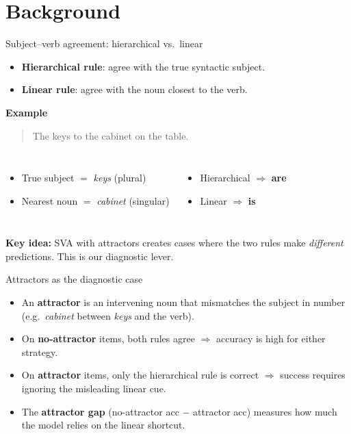 \section{Background}

\begin{frame}{Subject--verb agreement: hierarchical vs.\ linear}
  \begin{itemize}
    \item \textbf{Hierarchical rule}: agree with the true syntactic subject.
    \item \textbf{Linear rule}: agree with the noun closest to the verb.
  \end{itemize}

  \vspace{0.3cm}
  \textbf{Example}
  \begin{quote}
    The keys to the cabinet \underline{\hspace{1cm}} on the table.
  \end{quote}

  \begin{columns}[T]
    \begin{itemize}
      \item True subject $=$ \textit{keys} (plural)
      \item Nearest noun $=$ \textit{cabinet} (singular)
    \end{itemize}
    \begin{itemize}
      \item Hierarchical $\Rightarrow$ \textbf{are}
      \item Linear $\Rightarrow$ \textbf{is}
    \end{itemize}
  \end{columns}

  \vspace{0.3cm}
  \textbf{Key idea:} SVA with attractors creates cases where the two rules
  make \emph{different} predictions. This is our diagnostic lever.
\end{frame}

\begin{frame}{Attractors as the diagnostic case}
  \begin{itemize}
    \item An \textbf{attractor} is an intervening noun that mismatches the
          subject in number (e.g.\ \textit{cabinet} between
          \textit{keys} and the verb).
    \item On \textbf{no-attractor} items, both rules agree
          $\Rightarrow$ accuracy is high for either strategy.
    \item On \textbf{attractor} items, only the hierarchical rule is correct
          $\Rightarrow$ success requires ignoring the misleading linear cue.
    \item The \textbf{attractor gap} (no-attractor acc $-$ attractor acc)
          measures how much the model relies on the linear shortcut.
  \end{itemize}
\end{frame}

